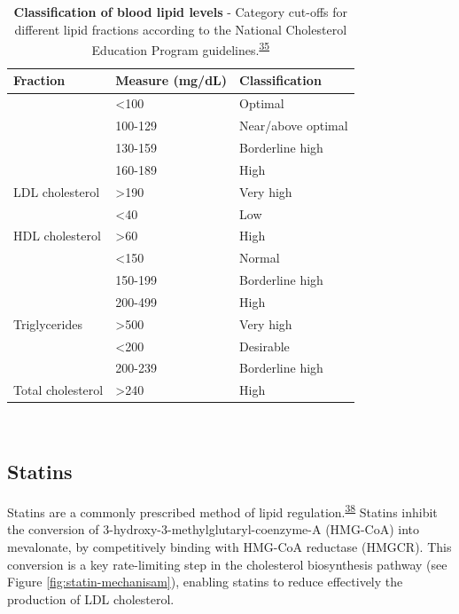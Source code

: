 \documentclass[a4paper, twoside]{templates/ociamthesis}
\begin{document}
\begin{table}[H]

\caption[Classification of blood lipid levels]{\label{tab:lipidLevels-table}\textbf{Classification of blood lipid levels} - Category cut-offs for different lipid fractions according to the National Cholesterol Education Program guidelines.\textsuperscript{\protect\hyperlink{ref-national2002third}{35}}}
\centering
\begin{tabular}[t]{lll}
\toprule
\textbf{Fraction} & \textbf{Measure (mg/dL)} & \textbf{Classification}\\
\midrule
 & <100 & Optimal\\
\cmidrule{2-3}
 & 100-129 & Near/above optimal\\
\cmidrule{2-3}
 & 130-159 & Borderline high\\
\cmidrule{2-3}
 & 160-189 & High\\
\cmidrule{2-3}
\multirow{-5}{*}{\raggedright\arraybackslash LDL cholesterol} & >190 & Very high\\
\cmidrule{1-3}
 & <40 & Low\\
\cmidrule{2-3}
\multirow{-2}{*}{\raggedright\arraybackslash HDL cholesterol} & >60 & High\\
\cmidrule{1-3}
 & <150 & Normal\\
\cmidrule{2-3}
 & 150-199 & Borderline high\\
\cmidrule{2-3}
 & 200-499 & High\\
\cmidrule{2-3}
\multirow{-4}{*}{\raggedright\arraybackslash Triglycerides} & >500 & Very high\\
\cmidrule{1-3}
 & <200 & Desirable\\
\cmidrule{2-3}
 & 200-239 & Borderline high\\
\cmidrule{2-3}
\multirow{-3}{*}{\raggedright\arraybackslash Total cholesterol} & >240 & High\\
\bottomrule
\end{tabular}
\end{table}

~

\hypertarget{intro-statins}{%
\subsection{Statins}\label{intro-statins}}

Statins are a commonly prescribed method of lipid regulation.\textsuperscript{\protect\hyperlink{ref-collins2016}{38}} Statins inhibit the conversion of 3-hydroxy-3-methylglutaryl-coenzyme-A (HMG-CoA) into mevalonate, by competitively binding with HMG-CoA reductase (HMGCR). This conversion is a key rate-limiting step in the cholesterol biosynthesis pathway (see Figure \ref{fig:statin-mechanisam}), enabling statins to reduce effectively the production of LDL cholesterol.
\end{document}
